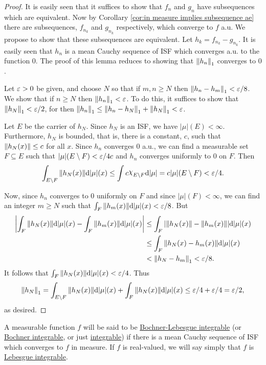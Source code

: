 \begin{proof}
It is easily seen that it suffices to show that $f_n$ and $g_n$ have subsequences which are equivalent. Now by Corollary \ref{cor:in measure implies subsequence ae} there are subsequences, $f_{n_k}$ and $g_{n_k}$ respectively, which converge to $f$ a.u. We propose to show that these subsequences are equivalent. Let $h_k=f_{n_k}-g_{n_k}$. It is easily seen that $h_n$ is a mean Cauchy sequence of ISF which converges a.u. to the function 0. The proof of this lemma reduces to showing that $\norm{h_n}_1$ converges to $0$.

Let $\varepsilon>0$ be given, and choose $N$ so that if $m,n\geq N$ then $\norm{h_n-h_m}_1<\varepsilon/8$. We show that if $n\geq N$ then $\norm{h_n}_1<\varepsilon$. To do this, it suffices to show that $\norm{h_N}_1<\varepsilon/2$, for then $\norm{h_n}_1\leq\norm{h_n-h_N}_1+\norm{h_N}_1<\varepsilon$.

Let $E$ be the carrier of $h_N$. Since $h_N$ is an ISF, we have $|\mu|(E)<\infty$. Furthermore, $h_N$ is bounded, that is, there is a constant, $c$, such that $\norm{h_N(x)}\leq c$ for all $x$. Since $h_n$ converges $0$ a.u., we can find a measurable set $F\subseteq E$ such that $|\mu|(E\setminus F)<\varepsilon/4c$ and $h_n$ converges uniformly to $0$ on $F$. Then $$\int_{E\sd F}\norm{h_N(x)}\dd|\mu|(x)\leq\int c\idf{E\sd F}\dd|\mu|=c|\mu|(E\sd F)<\ep/4.$$

Now, since $h_n$ converges to $0$ uniformly on $F$ and since $|\mu|(F)<\infty$, we can find an integer $m\geq N$ such that $\int_F\norm{h_m(x)}\dd|\mu|(x)<\varepsilon/8$. But
\begin{align*}
    \left\lvert\int_F\norm{h_N(x)}\dd|\mu|(x)-\int_F\norm{h_m(x)}\dd|\mu|(x)\right\rvert&\leq\int_F|\norm{h_N(x)}-\norm{h_m(x)}|\dd|\mu|(x)\\
    &\leq\int_F\norm{h_N(x)-h_m(x)}\dd|\mu|(x)\\
    &<\norm{h_N-h_m}_1<\varepsilon/8.
\end{align*}
It follows that $\int_F\norm{h_N(x)}\dd|\mu|(x)<\varepsilon/4$. Thus $$\norm{h_N}_1=\int_{E\setminus F}\norm{h_N(x)}\dd|\mu|(x)+\int_F\norm{h_N(x)}\dd|\mu|(x)\leq\varepsilon/4+\varepsilon/4=\varepsilon/2,$$ as desired.
\end{proof}

\begin{definition}
\label{def:bochner integrable}
A measurable function $f$ will be said to be \underline{Bochner-Lebesgue integrable} (or \underline{Bochner integrable}, or just \underline{integrable}) if there is a mean Cauchy sequence of ISF which converges to $f$ in measure. If $f$ is real-valued, we will say simply that $f$ is \underline{Lebesgue integrable}.
\end{definition}

